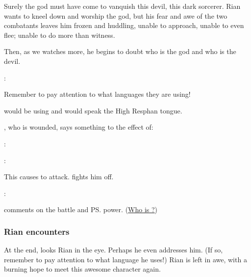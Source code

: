 \begin{garbage}
Surely the god must have come to vanquish this devil, this dark sorcerer. Rian wants to kneel down and worship the god, but his fear and awe of the two combatants leaves him frozen and huddling, unable to approach, unable to even flee; unable to do more than witness.

Then, as we watches more, he begins to doubt who is the god and who is the devil. 

\Ishna: 

Remember to pay attention to what languages they are using! 

\Ishnaruchaefir{} would be using \Draconic{} and \Teshrial{} would speak the High Resphan tongue.

\Ishnaruchaefir{}, who is wounded, says something to the effect of: 

\Teshrial: 

\Ishna: 

This causes \Teshrial{} to attack. \Ishnaruchaefir{} fights him off. 

\Ishna: 

\Criseis{} comments on the battle and \ps{\Teshrial} power. (\hyperref[Teshrial's history]{Who is \Teshrial?})





\subsubsection{Rian encounters \Ishna}
At the end, \Ishnaruchaefir{} looks Rian in the eye. Perhaps he even addresses him. (If so, remember to pay attention to what language he uses!) Rian is left in awe, with a burning hope to meet this awesome character again. 


\end{garbage}
